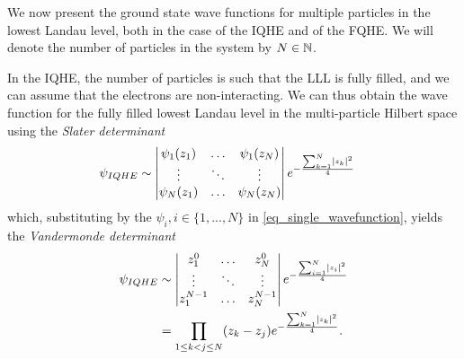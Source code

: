 \documentclass[notas.tex]{subfiles}
\begin{document}
We now present the ground state wave functions for multiple particles in the lowest Landau level, both in the case of the IQHE and of the FQHE. We will denote the number of particles in the system by $N \in \mathbb{N}$. 

In the IQHE, the number of particles is such that the LLL is fully filled, and we can assume that the electrons are non-interacting. We can thus obtain the wave function for the fully filled lowest Landau level in the multi-particle Hilbert space using the \emph{Slater determinant}
\begin{align*}
	\psi_{IQHE} &\sim \begin{vmatrix}
		\psi_1(z_1) & \hdots & \psi_1(z_N) \\
		\vdots & \ddots & \vdots \\
		\psi_N(z_1) & \hdots & \psi_N(z_N)
	\end{vmatrix} e^{-\frac{\sum_{k=1}^N \left|z_k\right|^2}{4}}
\end{align*}
which, substituting by the $\psi_i, i \in \{1,...,N\}$ in \eqref{eq_single_wavefunction}, yields the \emph{Vandermonde determinant}
\begin{align} \label{eq_integer_wavefunction}
	\psi_{IQHE} &\sim \begin{vmatrix}
		z_1^0 & \hdots & z_N^0 \\
		\vdots & \ddots & \vdots \\
		z_1^{N-1} & \hdots & z_N^{N-1}
	\end{vmatrix} e^{-\frac{\sum_{i=1}^N \left|z_i\right|^2}{4}} \nonumber \\ 
	&= \prod_{1 \leq k<j \leq N}(z_k - z_j) e^{-\frac{\sum_{k=1}^N \left|z_k\right|^2}{4}}.
\end{align}
\end{document}
